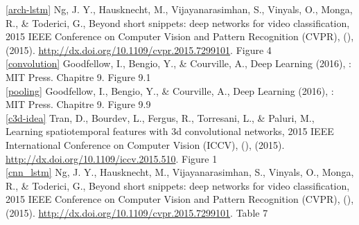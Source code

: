 \documentclass[11pt]{article}
\begin{document}
\ref{arch-lstm} Ng, J. Y., Hausknecht, M., Vijayanarasimhan, S., Vinyals, O., Monga, R., \& Toderici, G., Beyond short snippets: deep networks for video classification, 2015 IEEE Conference on Computer Vision and Pattern Recognition (CVPR), (),  (2015).  \url{http://dx.doi.org/10.1109/cvpr.2015.7299101}. Figure 4\\

\ref{convolution} Goodfellow, I., Bengio, Y., \& Courville, A., Deep Learning (2016), : MIT Press. Chapitre 9. Figure 9.1\\

\ref{pooling} Goodfellow, I., Bengio, Y., \& Courville, A., Deep Learning (2016), : MIT Press. Chapitre 9. Figure 9.9\\

\ref{c3d-idea} Tran, D., Bourdev, L., Fergus, R., Torresani, L., \& Paluri, M., Learning spatiotemporal features with 3d convolutional networks, 2015 IEEE International Conference on Computer Vision (ICCV), (),  (2015).  \url{http://dx.doi.org/10.1109/iccv.2015.510}. Figure 1\\

\ref{cnn_lstm} Ng, J. Y., Hausknecht, M., Vijayanarasimhan, S., Vinyals, O., Monga, R., \& Toderici, G., Beyond short snippets: deep networks for video classification, 2015 IEEE Conference on Computer Vision and Pattern Recognition (CVPR), (),  (2015).  \url{http://dx.doi.org/10.1109/cvpr.2015.7299101}. Table 7\\
\\
\\
\end{document}
